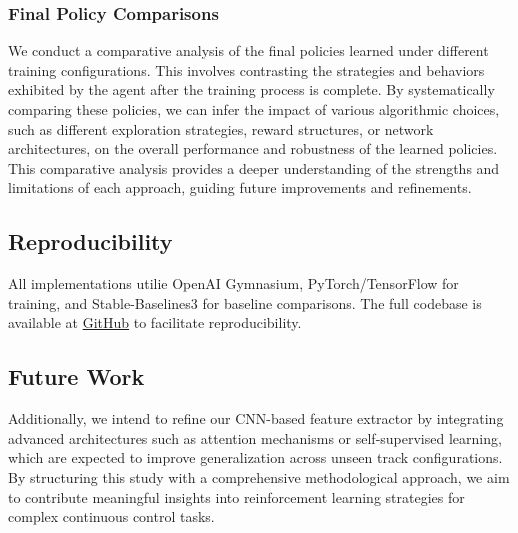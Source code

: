 \documentclass[../CSC_52081_EP.tex]{subfiles}
\begin{document}
\subsubsection{Final Policy Comparisons}
We conduct a comparative analysis of the final policies learned under different training configurations. This involves contrasting the strategies and behaviors exhibited by the agent after the training process is complete. By systematically comparing these policies, we can infer the impact of various algorithmic choices, such as different exploration strategies, reward structures, or network architectures, on the overall performance and robustness of the learned policies. This comparative analysis provides a deeper understanding of the strengths and limitations of each approach, guiding future improvements and refinements.


\subsection{Reproducibility}
All implementations utilie OpenAI Gymnasium, PyTorch/TensorFlow for training, and Stable-Baselines3 for baseline comparisons. The full codebase is available at \href{https://github.com/tr0fin0/ensta_CSC_52081_EP_project}{GitHub} to facilitate reproducibility.


\subsection{Future Work}
Additionally, we intend to refine our CNN-based feature extractor by integrating advanced architectures such as attention mechanisms or self-supervised learning, which are expected to improve generalization across unseen track configurations. By structuring this study with a comprehensive methodological approach, we aim to contribute meaningful insights into reinforcement learning strategies for complex continuous control tasks.
\end{document}
